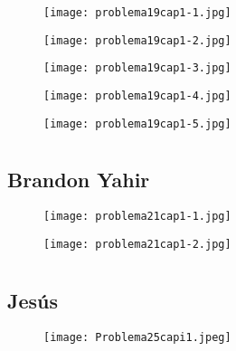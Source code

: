 \documentclass[12pt]{article}
\begin{document}
\begin{figure}[htb] 
\centering \texttt{[image: problema19cap1-1.jpg]} 
\end{figure}
\newpage
\begin{figure}[htb] 
\centering \texttt{[image: problema19cap1-2.jpg]} 
\end{figure}
\newpage
\begin{figure}[htb] 
\centering \texttt{[image: problema19cap1-3.jpg]} 
\end{figure}
\newpage
\begin{figure}[htb] 
\centering \texttt{[image: problema19cap1-4.jpg]} 
\end{figure}
\newpage
\begin{figure}[htb] 
\centering \texttt{[image: problema19cap1-5.jpg]} 
\end{figure}

\newpage

\section{ }
\subsection{{} Brandon Yahir}

\begin{figure}[htb] 
\centering \texttt{[image: problema21cap1-1.jpg]} 
\end{figure}

\newpage

\begin{figure}[htb] 
\centering \texttt{[image: problema21cap1-2.jpg]} 
\end{figure}
\newpage

\section{ }
\subsection{{} Jesús}

\begin{figure}[htb] 
\centering \texttt{[image: Problema25capi1.jpeg]} 
\end{figure}
\newpage

\section{ }
\end{document}
